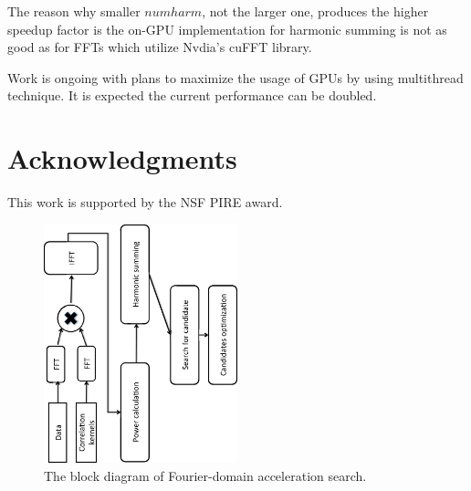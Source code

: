 \documentclass[preprint2]{aastex}
\begin{document}
The reason why smaller $numharm$, not the larger one, produces the higher speedup factor is the on-GPU 
implementation for harmonic summing is not as good as for FFTs which utilize Nvdia's cuFFT library. 

Work is ongoing with plans to maximize the usage of GPUs by using multithread technique. It is 
expected the current performance can be doubled. 
\section{Acknowledgments}
This work is supported by the NSF PIRE award.

\begin{figure}
\centering
\includegraphics[angle=-90, width=0.5\textwidth]{fig/accelsearch_diagram.eps}
\caption{The block diagram of Fourier-domain acceleration search.}
\label{fig:blkgram}
\end{figure}
\end{document}
